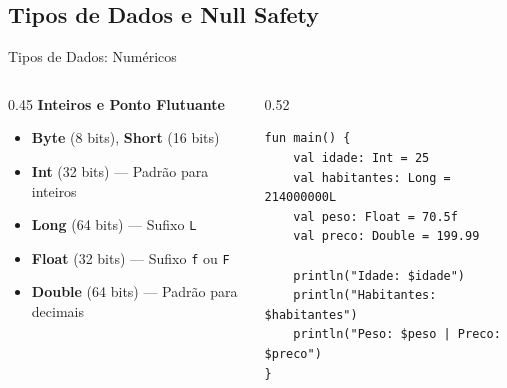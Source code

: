 \documentclass[aspectratio=169]{beamer}
\begin{document}
\subsection{Tipos de Dados e Null Safety}

\begin{frame}[fragile]{Tipos de Dados: Numéricos}
  \begin{columns}[T]
    \begin{column}{0.45\textwidth}
      \textbf{Inteiros e Ponto Flutuante}
      \vspace{0.3em}
      \begin{itemize}\small
        \item \textbf{Byte} (8 bits), \textbf{Short} (16 bits)
        \item \textbf{Int} (32 bits) — Padrão para inteiros
        \item \textbf{Long} (64 bits) — Sufixo \texttt{L}
        \item \textbf{Float} (32 bits) — Sufixo \texttt{f} ou \texttt{F}
        \item \textbf{Double} (64 bits) — Padrão para decimais
      \end{itemize}
    \end{column}
    \begin{column}{0.52\textwidth}
\begin{lstlisting}[style=KotlinStyle]
fun main() {
    val idade: Int = 25
    val habitantes: Long = 214000000L
    val peso: Float = 70.5f
    val preco: Double = 199.99

    println("Idade: $idade")
    println("Habitantes: $habitantes")
    println("Peso: $peso | Preco: $preco")
}
\end{lstlisting}
    \end{column}
  \end{columns}
\end{frame}
\end{document}
